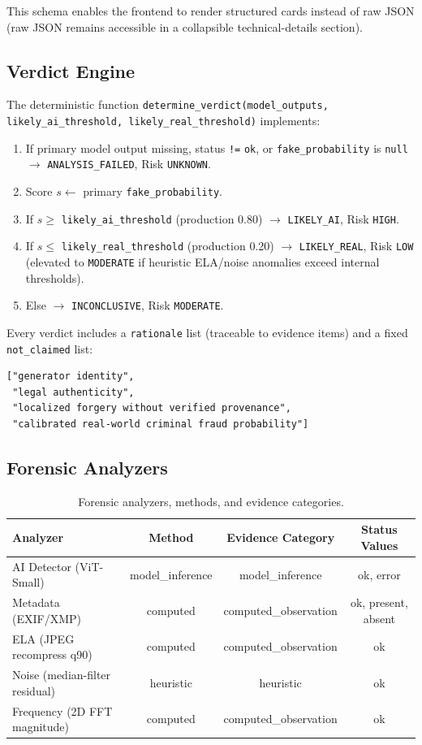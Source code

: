 \documentclass[10pt,conference,compsoc]{IEEEtran}
\begin{document}
This schema enables the frontend to render structured cards instead of raw JSON (raw JSON remains accessible in a collapsible technical-details section).

\subsection{Verdict Engine}
\label{sec:verdict}

The deterministic function \texttt{determine\_verdict(model\_outputs, likely\_ai\_threshold, likely\_real\_threshold)} implements:
\begin{enumerate}
  \item If primary model output missing, status \texttt{!=} \texttt{ok}, or \texttt{fake\_probability} is \texttt{null} $\to$ \texttt{ANALYSIS\_FAILED}, Risk \texttt{UNKNOWN}.
  \item Score $s \gets$ primary \texttt{fake\_probability}.
  \item If $s \geq$ \texttt{likely\_ai\_threshold} (production 0.80) $\to$ \texttt{LIKELY\_AI}, Risk \texttt{HIGH}.
  \item If $s \leq$ \texttt{likely\_real\_threshold} (production 0.20) $\to$ \texttt{LIKELY\_REAL}, Risk \texttt{LOW} (elevated to \texttt{MODERATE} if heuristic ELA/noise anomalies exceed internal thresholds).
  \item Else $\to$ \texttt{INCONCLUSIVE}, Risk \texttt{MODERATE}.
\end{enumerate}
Every verdict includes a \texttt{rationale} list (traceable to evidence items) and a fixed \texttt{not\_claimed} list:
\begin{verbatim}
["generator identity",
 "legal authenticity",
 "localized forgery without verified provenance",
 "calibrated real-world criminal fraud probability"]
\end{verbatim}

\subsection{Forensic Analyzers}
\label{sec:analyzers}

\begin{table}[t]
\caption{Forensic analyzers, methods, and evidence categories.}
\label{tab:analyzers}
\centering
\begin{tabular}{lccc}
\toprule
Analyzer & Method & Evidence Category & Status Values \\
\midrule
AI Detector (ViT-Small) & model\_inference & model\_inference & ok, error \\
Metadata (EXIF/XMP) & computed & computed\_observation & ok, present, absent \\
ELA (JPEG recompress q90) & computed & computed\_observation & ok \\
Noise (median-filter residual) & heuristic & heuristic & ok \\
Frequency (2D FFT magnitude) & computed & computed\_observation & ok \\
\bottomrule
\end{tabular}
\end{table}
\end{document}

